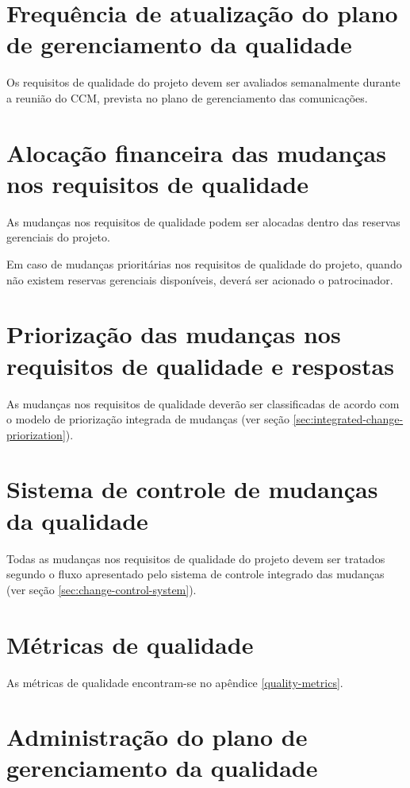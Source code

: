 \section{Frequência de atualização do plano de gerenciamento da qualidade}

Os requisitos de qualidade do projeto devem ser avaliados semanalmente durante a reunião do CCM, prevista no plano de gerenciamento das comunicações.

\section{Alocação financeira das mudanças nos requisitos de qualidade}

As mudanças nos requisitos de qualidade podem ser alocadas dentro das reservas gerenciais do projeto.

Em caso de mudanças prioritárias nos requisitos de qualidade do projeto, quando não existem reservas gerenciais disponíveis, deverá ser acionado o patrocinador.

\section{Priorização das mudanças nos requisitos de qualidade e respostas}

As mudanças nos requisitos de qualidade deverão ser classificadas de acordo com o modelo de priorização integrada de mudanças (ver seção \ref{sec:integrated-change-priorization}).

\section{Sistema de controle de mudanças da qualidade}

Todas as mudanças nos requisitos de qualidade do projeto devem ser tratados segundo o fluxo apresentado pelo sistema de controle integrado das mudanças (ver seção \ref{sec:change-control-system}).

\section{Métricas de qualidade}

As métricas de qualidade encontram-se no apêndice \ref{quality-metrics}.

\section{Administração do plano de gerenciamento da qualidade}

